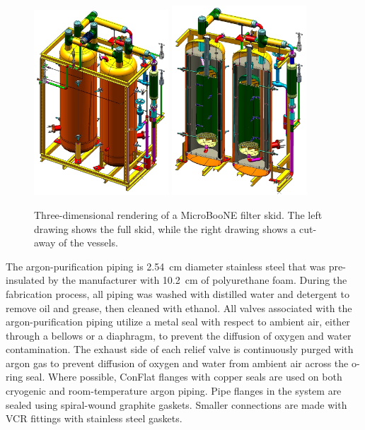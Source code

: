\begin{figure}
\centering 
\includegraphics[width=0.45\textwidth]{figures/cryo-filter-skid}
\includegraphics[width=0.45\textwidth]{figures/cryo-filter-skid-cutaway}
\caption{Three-dimensional rendering of a MicroBooNE filter skid.  The left drawing shows the full skid, while the right drawing shows a cut-away of the vessels.}
\label{filters}
\end{figure}



The argon-purification piping is 2.54~cm diameter stainless steel that was pre-insulated by the manufacturer with 10.2~cm of polyurethane foam.  During the fabrication process, all piping was washed with distilled water and detergent to remove oil and grease, then cleaned with ethanol.  All valves associated with the argon-purification piping utilize a metal seal with respect to ambient air, either through a bellows or a diaphragm, to prevent the diffusion of oxygen and water contamination.  The exhaust side of each relief valve is continuously purged with argon gas to prevent diffusion of oxygen and water from ambient air across the o-ring seal.  Where possible, ConFlat flanges with copper seals are used on both cryogenic and room-temperature argon piping.  Pipe flanges in the system are sealed using spiral-wound graphite gaskets.  Smaller connections are made with VCR fittings with stainless steel gaskets.  

